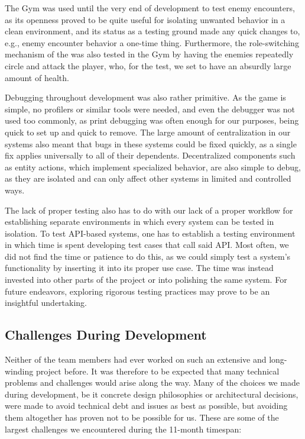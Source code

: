 \documentclass[../Main.tex]{subfiles}
\begin{document}
The Gym was used until the very end of development to test enemy encounters, as its openness proved to be quite useful for isolating unwanted behavior in a clean environment, and its status as a testing ground made any quick changes to, e.g., enemy encounter behavior a one-time thing. Furthermore, the role-switching mechanism of the  was also tested in the Gym by having the enemies repeatedly circle and attack the player, who, for the test, we set to have an absurdly large amount of health.

Debugging throughout development was also rather primitive. As the game is simple, no profilers or similar tools were needed, and even the debugger was not used too commonly, as print debugging was often enough for our purposes, being quick to set up and quick to remove. The large amount of centralization in our systems also meant that bugs in these systems could be fixed quickly, as a single fix applies universally to all of their dependents. Decentralized components such as entity actions, which implement specialized behavior, are also simple to debug, as they are isolated and can only affect other systems in limited and controlled ways.

The lack of proper testing also has to do with our lack of a proper workflow for establishing separate environments in which every system can be tested in isolation. To test API-based systems, one has to establish a testing environment in which time is spent developing test cases that call said API. Most often, we did not find the time or patience to do this, as we could simply test a system's functionality by inserting it into its proper use case. The time was instead invested into other parts of the project or into polishing the same system. For future endeavors, exploring rigorous testing practices may prove to be an insightful undertaking.

\subsection{Challenges During Development}\label{sec:challenges-during-development}

Neither of the team members had ever worked on such an extensive and long-winding project before. It was therefore to be expected that many technical problems and challenges would arise along the way. Many of the choices we made during development, be it concrete design philosophies or architectural decisions, were made to avoid technical debt and issues as best as possible, but avoiding them altogether has proven not to be possible for us. These are some of the largest challenges we encountered during the 11-month timespan:
\end{document}
